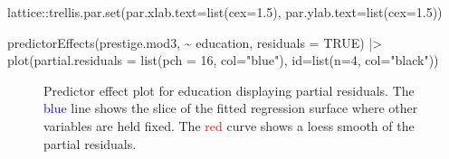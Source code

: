 \documentclass[
  letterpaper,
  10pt,
  krantz2]{krantz}
\makeatletter
\newenvironment{Shaded}{\begin{snugshade}}{\end{snugshade}}
\newcommand{\AttributeTok}[1]{\textcolor[rgb]{0.40,0.45,0.13}{#1}}
\newcommand{\ConstantTok}[1]{\textcolor[rgb]{0.56,0.35,0.01}{#1}}
\newcommand{\DecValTok}[1]{\textcolor[rgb]{0.68,0.00,0.00}{#1}}
\newcommand{\FloatTok}[1]{\textcolor[rgb]{0.68,0.00,0.00}{#1}}
\newcommand{\FunctionTok}[1]{\textcolor[rgb]{0.28,0.35,0.67}{#1}}
\newcommand{\NormalTok}[1]{\textcolor[rgb]{0.00,0.23,0.31}{#1}}
\newcommand{\SpecialCharTok}[1]{\textcolor[rgb]{0.37,0.37,0.37}{#1}}
\newcommand{\StringTok}[1]{\textcolor[rgb]{0.13,0.47,0.30}{#1}}
\newenvironment{kframe}{%
  \medskip{}
  \setlength{\fboxsep}{.8em}
  \def\at@end@of@kframe{}%
  \ifinner\ifhmode%
  \def\at@end@of@kframe{\end{minipage}}%
  \begin{minipage}{\columnwidth}%
  \fi\fi%
  \def\FrameCommand##1{\hskip\@totalleftmargin \hskip-\fboxsep
  \colorbox{shadecolor}{##1}\hskip-\fboxsep
      \hskip-\linewidth \hskip-\@totalleftmargin \hskip\columnwidth}%
  \MakeFramed {\advance\hsize-\width
    \@totalleftmargin\z@ \linewidth\hsize
    \@setminipage}}%
{\par\unskip\endMakeFramed%
  \at@end@of@kframe}
\renewenvironment{Shaded}{\begin{kframe}}{\end{kframe}}
\makeatother
\begin{document}
\begin{Shaded}
\begin{Highlighting}[]
\NormalTok{lattice}\SpecialCharTok{::}\FunctionTok{trellis.par.set}\NormalTok{(}\AttributeTok{par.xlab.text=}\FunctionTok{list}\NormalTok{(}\AttributeTok{cex=}\FloatTok{1.5}\NormalTok{),}
                         \AttributeTok{par.ylab.text=}\FunctionTok{list}\NormalTok{(}\AttributeTok{cex=}\FloatTok{1.5}\NormalTok{))}

\FunctionTok{predictorEffects}\NormalTok{(prestige.mod3, }\SpecialCharTok{\textasciitilde{}}\NormalTok{ education,}
                 \AttributeTok{residuals =} \ConstantTok{TRUE}\NormalTok{) }\SpecialCharTok{|\textgreater{}}
  \FunctionTok{plot}\NormalTok{(}\AttributeTok{partial.residuals =} \FunctionTok{list}\NormalTok{(}\AttributeTok{pch =} \DecValTok{16}\NormalTok{, }\AttributeTok{col=}\StringTok{"blue"}\NormalTok{),}
       \AttributeTok{id=}\FunctionTok{list}\NormalTok{(}\AttributeTok{n=}\DecValTok{4}\NormalTok{, }\AttributeTok{col=}\StringTok{"black"}\NormalTok{)) }
\end{Highlighting}
\end{Shaded}

\begin{figure}[H]


\caption{\label{fig-prestige-effplot-educ}Predictor effect plot for
education displaying partial residuals. The \textcolor{blue}{blue} line
shows the slice of the fitted regression surface where other variables
are held fixed. The \textcolor{red}{red} curve shows a loess smooth of
the partial residuals.}

\end{figure}%
\end{document}
